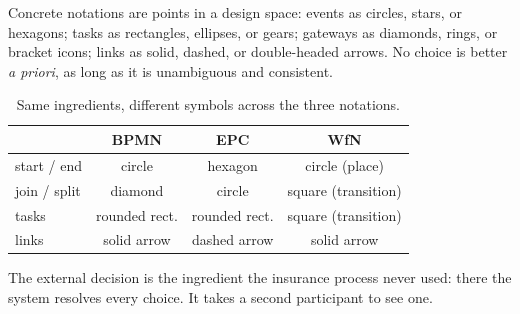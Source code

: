 Concrete notations are points in a design space: events as circles, stars, or hexagons; tasks as rectangles, ellipses, or gears; gateways as diamonds, rings, or bracket icons; links as solid, dashed, or double-headed arrows. No choice is better \emph{a priori}, as long as it is unambiguous and consistent.

\begin{table}[h]
\centering
\caption{Same ingredients, different symbols across the three notations.}
\begin{tabular}{lccc}
\toprule
 & \textbf{BPMN} & \textbf{EPC} & \textbf{WfN} \\
\midrule
start / end & circle & hexagon & circle (place) \\
join / split & diamond & circle & square (transition) \\
tasks       & rounded rect. & rounded rect. & square (transition) \\
links       & solid arrow & dashed arrow & solid arrow \\
\bottomrule
\end{tabular}
\end{table}

The external decision is the ingredient the insurance process never used: there the system resolves every choice. It takes a second participant to see one.

